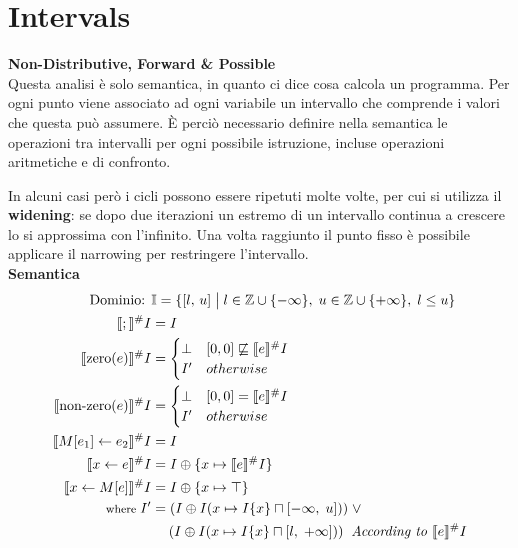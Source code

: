 \documentclass[a4paper,12pt,openany]{article}
\begin{document}
    
    \clearpage\section*{Intervals}
    \textbf{Non-Distributive, Forward \& Possible}\\[1em]
    Questa analisi è solo semantica, in quanto ci dice cosa calcola un programma. Per ogni punto viene associato ad ogni variabile un intervallo che comprende i valori che questa può assumere. È perciò necessario definire nella semantica le operazioni tra intervalli per ogni possibile istruzione, incluse operazioni aritmetiche e di confronto.
    
    In alcuni casi però i cicli possono essere ripetuti molte volte, per cui si utilizza il \textbf{widening}: se dopo due iterazioni un estremo di un intervallo continua a crescere lo si approssima con l'infinito. Una volta raggiunto il punto fisso è possibile applicare il narrowing per restringere l'intervallo.\\[1em]

    \textbf{Semantica}
    \begin{align*}
    \mbox{Dominio: }& \mathbb{I}=\{[l,\,u]\;\big\vert\; l\in\mathbb{Z}\cup\{-\infty\},\; u\in\mathbb{Z}\cup\{+\infty\},\; l\leq u\}\\
    \llbracket ; \rrbracket^\#I &= I\\
    \llbracket \mbox{zero}(e) \rrbracket^\#I &= 
    \begin{cases}
        \bot & [0, 0] \not\sqsubseteq \llbracket e \rrbracket^\#I\\
        I' & otherwise
    \end{cases}\\
    \llbracket \mbox{non-zero}(e) \rrbracket^\#I &= 
    \begin{cases}
        \bot & [0, 0] = \llbracket e \rrbracket^\#I\\
        I' & otherwise
    \end{cases}\\
    \llbracket M[e_1]\leftarrow e_2 \rrbracket^\#I &= I\\
    \llbracket x \leftarrow e \rrbracket^\#I &= I\oplus \{x\mapsto\llbracket e \rrbracket^\#I\}\\
    \llbracket x \leftarrow M[e] \rrbracket^\#I &= I\oplus \{x\mapsto\top\}\\
    \mbox{\footnotesize where } I' &= (I \oplus I(x\mapsto I\{x\} \sqcap [-\infty,\; u]))\; \lor\\
    & \hspace{1.25em} (I \oplus I(x\mapsto I\{x\} \sqcap [l,\; +\infty]))\;\; \mbox{\textit{According to} } \llbracket e \rrbracket^\#I
    \end{align*}
\end{document}

